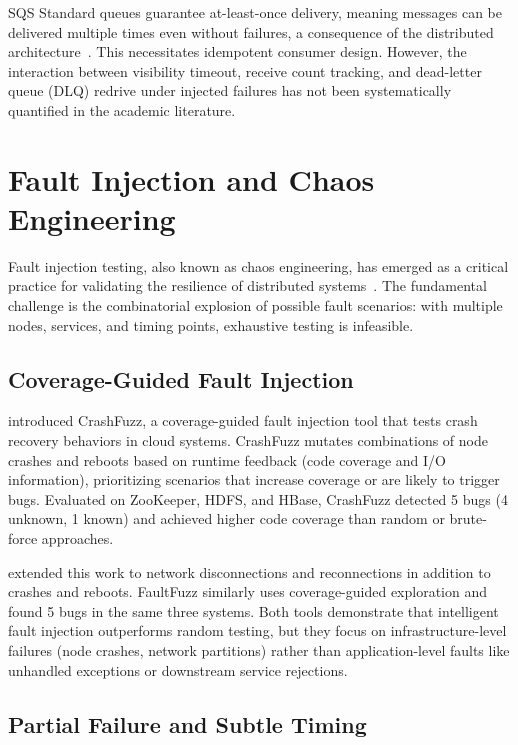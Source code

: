 SQS Standard queues guarantee at-least-once delivery, meaning messages can be delivered multiple times even without failures, a consequence of the distributed architecture~\citep{AWSSQSGuide}. This necessitates idempotent consumer design. However, the interaction between visibility timeout, receive count tracking, and dead-letter queue (DLQ) redrive under injected failures has not been systematically quantified in the academic literature.

\section{Fault Injection and Chaos Engineering}

Fault injection testing, also known as chaos engineering, has emerged as a critical practice for validating the resilience of distributed systems~\citep{Wu2024Legolas, Gao2023CrashFuzz}. The fundamental challenge is the combinatorial explosion of possible fault scenarios: with multiple nodes, services, and timing points, exhaustive testing is infeasible.

\subsection{Coverage-Guided Fault Injection}

\citet{Gao2023CrashFuzz} introduced CrashFuzz, a coverage-guided fault injection tool that tests crash recovery behaviors in cloud systems. CrashFuzz mutates combinations of node crashes and reboots based on runtime feedback (code coverage and I/O information), prioritizing scenarios that increase coverage or are likely to trigger bugs. Evaluated on ZooKeeper, HDFS, and HBase, CrashFuzz detected 5 bugs (4 unknown, 1 known) and achieved higher code coverage than random or brute-force approaches.

\citet{Dou2024FaultFuzz} extended this work to network disconnections and reconnections in addition to crashes and reboots. FaultFuzz similarly uses coverage-guided exploration and found 5 bugs in the same three systems. Both tools demonstrate that intelligent fault injection outperforms random testing, but they focus on infrastructure-level failures (node crashes, network partitions) rather than application-level faults like unhandled exceptions or downstream service rejections.

\subsection{Partial Failure and Subtle Timing}

